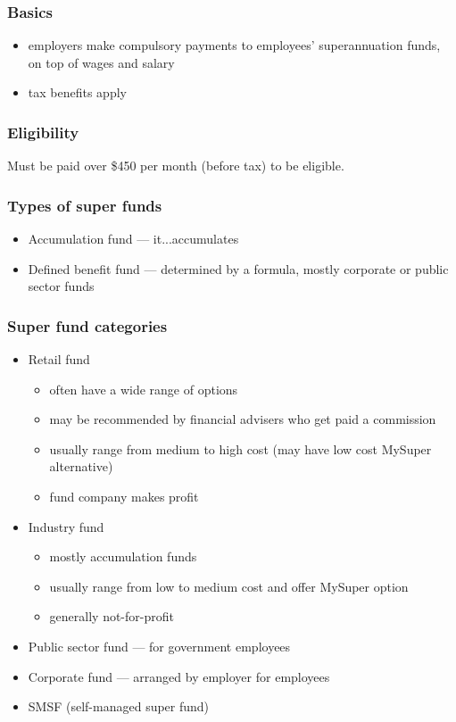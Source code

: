 \subsubsection{Basics}
\begin{itemize}
	\item employers make compulsory payments to employees' superannuation funds, on top of wages and salary
	\item tax benefits apply
\end{itemize}

\subsubsection{Eligibility}
Must be paid over \$450 per month (before tax) to be eligible.

\subsubsection{Types of super funds}
\begin{itemize}
	\item Accumulation fund --- it...accumulates
	\item Defined benefit fund --- determined by a formula, mostly corporate or public sector funds
\end{itemize}

\subsubsection{Super fund categories}
\begin{itemize}
	\item Retail fund
	\begin{itemize}
		\item often have a wide range of options
		\item may be recommended by financial advisers who get paid a commission
		\item usually range from medium to high cost (may have low cost MySuper alternative)
		\item fund company makes profit
	\end{itemize}
	\item Industry fund
	\begin{itemize}
		\item mostly accumulation funds
		\item usually range from low to medium cost and offer MySuper option
		\item generally not-for-profit
	\end{itemize}
	\item Public sector fund --- for government employees
 	\item Corporate fund --- arranged by employer for employees
	\item SMSF (self-managed super fund)
\end{itemize}

